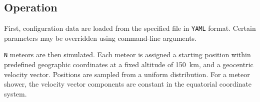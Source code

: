     \subsection{Operation} \label{sim:op}
        First, configuration data are loaded from the specified file in \texttt{YAML} format.
        Certain parameters may be overridden using command-line arguments.

        \texttt{N} meteors are then simulated. Each meteor is assigned a starting position within predefined
        geographic coordinates at a fixed altitude of \SI{150}{\kilo\metre}, and a geocentric velocity vector.
        Positions are sampled from a uniform distribution. For a meteor shower, the velocity vector components
        are constant in the equatorial coordinate system.

